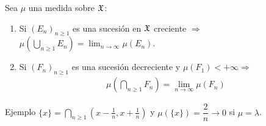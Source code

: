 \begin{lemma}
    Sea \(\mu\) una medida sobre \(\mathfrak{X}\):
    \begin{enumerate}
        \item Si \((E_n)_{n \geq 1}\) es una sucesión en \(\mathfrak{X}\) creciente \(\Rightarrow\) \(\mu(\bigcup_{n \geq 1} E_n) = \lim_{n \to \infty} \mu(E_n)\).
        \item Si \((F_n)_{n \geq 1}\) es una sucesión decreciente y \(\mu(F_1) < +\infty \Rightarrow\) \begin{align*}
                  \mu(\bigcap_{n \geq 1} F_n) = \lim_{n \to \infty} \mu(F_n)
              \end{align*}
    \end{enumerate}
    Ejemplo \(\{ x \} = \bigcap_{n \geq 1} (x - \frac{1}{n}, x + \frac{1}{n})\) y \(\mu(\{ x \}) = \dfrac{2}{n} \to 0\) si \(\mu = \lambda\).


\end{lemma}
